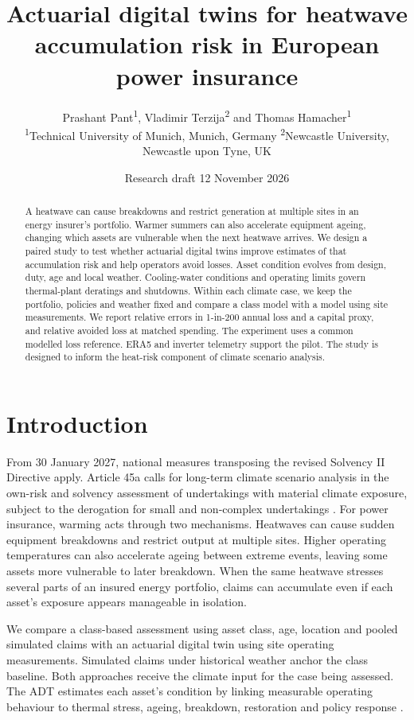 \documentclass[11pt,a4paper]{article}
\title{\bfseries Actuarial digital twins for heatwave accumulation risk in European power insurance}
\author{Prashant Pant\textsuperscript{1}, Vladimir Terzija\textsuperscript{2} and Thomas Hamacher\textsuperscript{1}\\[0.5em]
\small \textsuperscript{1}Technical University of Munich, Munich, Germany\quad
\textsuperscript{2}Newcastle University, Newcastle upon Tyne, UK}
\date{\small Research draft \textbar{} 12 November 2026}
\begin{document}
\maketitle
\begin{abstract}
A heatwave can cause breakdowns and restrict generation at multiple sites in an energy insurer's portfolio. Warmer summers can also accelerate equipment ageing, changing which assets are vulnerable when the next heatwave arrives. We design a paired study to test whether actuarial digital twins improve estimates of that accumulation risk and help operators avoid losses. Asset condition evolves from design, duty, age and local weather. Cooling-water conditions and operating limits govern thermal-plant deratings and shutdowns. Within each climate case, we keep the portfolio, policies and weather fixed and compare a class model with a model using site measurements. We report relative errors in 1-in-200 annual loss and a capital proxy, and relative avoided loss at matched spending. The experiment uses a common modelled loss reference. ERA5 and inverter telemetry support the pilot. The study is designed to inform the heat-risk component of climate scenario analysis.
\end{abstract}

\section*{Introduction}

From 30 January 2027, national measures transposing the revised Solvency II Directive apply. Article 45a calls for long-term climate scenario analysis in the own-risk and solvency assessment of undertakings with material climate exposure, subject to the derogation for small and non-complex undertakings \cite{solvency}. For power insurance, warming acts through two mechanisms. Heatwaves can cause sudden equipment breakdowns and restrict output at multiple sites. Higher operating temperatures can also accelerate ageing between extreme events, leaving some assets more vulnerable to later breakdown. When the same heatwave stresses several parts of an insured energy portfolio, claims can accumulate even if each asset's exposure appears manageable in isolation.

We compare a class-based assessment using asset class, age, location and pooled simulated claims with an actuarial digital twin using site operating measurements. Simulated claims under historical weather anchor the class baseline. Both approaches receive the climate input for the case being assessed. The ADT estimates each asset's condition by linking measurable operating behaviour to thermal stress, ageing, breakdown, restoration and policy response \cite{aes,dtinsure,sparc}.
\end{document}
